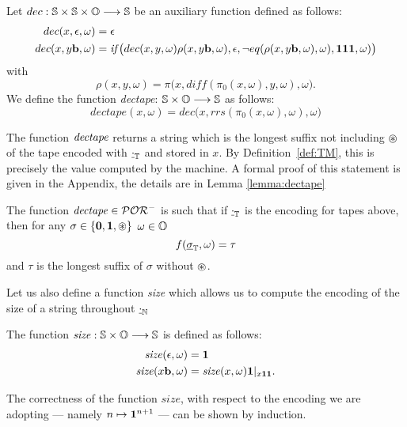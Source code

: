\begin{defn}
Let $dec :\mathbb{S}\times \mathbb{S} \times \mathbb{O}
\longrightarrow \mathbb{S}$ be an auxiliary function defined
as follows:
\begin{align*}
dec(x,\epsilon,\omega) &= \epsilon \\
dec(x, y\mathbf{b},\omega) &= \mathit{if}\big(dec(x,y,\omega)
\rho (x,y\mathbf{b},\omega), \epsilon,
\lnot eq(\rho(x,y\mathbf{b},\omega),\omega), \mathbf{1}\mathbf{1}\mathbf{1},\omega)\big)
\end{align*}
with
$$
\rho(x,y,\omega) = \pi\big(x,
diff(\pi_0(x,\omega), y,\omega),\omega\big).
$$
We define the function \emph{dectape}:
$\mathbb{S}  \times \mathbb{O} \longrightarrow \mathbb{S}$
as follows:
$$
dectape(x,\omega) = dec\big(x,rrs(\pi_0(x,\omega),\omega),
\omega\big)
$$
\end{defn}
%
%
\noindent
The function $\mathit{dectape}$ returns a string which is the
longest suffix not including $\circledast$
of the tape encoded with ${\underline {\cdot}}_{\mathbb{T}}$ and stored in $x$.
By Definition~\ref{def:TM}, this is precisely
the value computed by the machine.
A formal proof of this statement
is given in the Appendix, the details are in Lemma \ref{lemma:dectape}

\begin{lemma}\label{lemma:dectape}
{The function $\mathit{dectape}\in \mathcal{POR}^-$
is such that if $\underline{\cdot}_{\mathbb{T}}$
is the encoding for tapes above,
then for any $\sigma\in \{\mathbf{0},\mathbf{1},\circledast\}$
$\omega \in \mathbb{O}$}
$$
f(\underline{\sigma}_{\mathbb{T}}, \omega) = \tau
$$
and $\tau$ is the longest suffix of $\sigma$ without $\circledast$.
\end{lemma}


Let us also define a function \emph{size}
which allows us to compute the
encoding of the size of a string throughout
$\underline{\cdot}_{\mathbb{N}}$
\begin{defn}
The function $\mathit{size} : \mathbb{S}\times \mathbb{O} \longrightarrow \mathbb{S}$
is defined as follows:
\begin{align*}
\mathit{size}(\epsilon, \omega) &= \mathbf{1} \\
\mathit{size}(x\mathbf{b},\omega) &= \mathit{size}(x,\omega)\mathbf{1}|_{x\mathbf{1}\mathbf{1}}.
\end{align*}
\end{defn}

The correctness of the function $\mathit{size}$, with respect to the
encoding we are adopting --- namely $n \mapsto\mathbf{1}^{n +1}$ ---
can be shown by induction.













